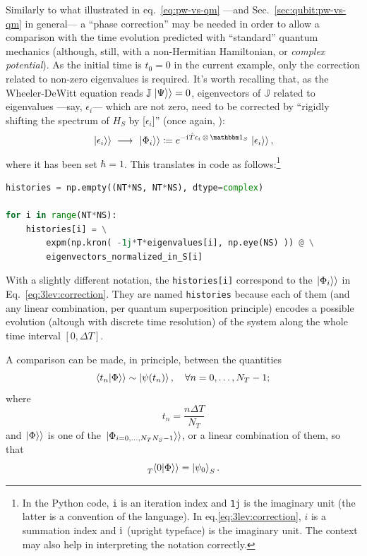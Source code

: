 Similarly to what illustrated in eq.~\eqref{eq:pw-vs-qm} ---and Sec.~\ref{sec:qubit:pw-vs-qm} in general---
a ``phase correction'' may be needed in order to allow a comparison with
the time evolution predicted with ``standard'' quantum mechanics
(although, still, with a non-Hermitian Hamiltonian, or \emph{complex potential}).
As the initial time is $t_0=0$ in the current example, only the
correction related to non-zero eigenvalues is required.
It's worth recalling that,
as the Wheeler-DeWitt equation reads $\mathbb{J} \left.\left| \Psi \right\rangle\right\rangle = 0$,
eigenvectors of $\mathbb{J}$ related to eigenvalues ---say, $\epsilon_{i}$---
which are not zero,
need to be corrected by ``rigidly shifting the spectrum of $H_{S}$
by [$\epsilon_{i}$]'' (once again, \cite[``\textit{The Zero-eigenvalue}'']{Lloyd:Time}):
\begin{equation}
  \dket{\epsilon_i} \;\longrightarrow\; \dket{\Phi_{i}} \eqbydef e^{ -\iu \hat{T} \epsilon_{i} \, \ox \, \idop_{S}} \dket{\epsilon_{i}} \text{,}
  \label{eq:3lev:correction}
\end{equation}
where it has been set $\hbar=1$. This translates in code as follows:\footnote{
  In the Python code, \Verb+i+ is an iteration index and \Verb|1j| is the imaginary unit
  (the latter is a convention of the language).
  In eq.\eqref{eq:3lev:correction},
  $i$ is a summation index and $\mathrm{i}\mkern1mu$ (upright typeface) is the imaginary unit.
  The context may also help in interpreting the notation correctly.
}
\begin{lstlisting}[language=Python]
histories = np.empty((NT*NS, NT*NS), dtype=complex)

for i in range(NT*NS):
    histories[i] = \
        expm(np.kron( -1j*T*eigenvalues[i], np.eye(NS) )) @ \
        eigenvectors_normalized_in_S[i]
\end{lstlisting}
%
With a slightly different notation,
the \Verb|histories[i]|
correspond to the $\left.\left| \Phi_i \right\rangle\right\rangle$ in Eq.~\eqref{eq:3lev:correction}.
They are named \Verb!histories! because each of them
(and any linear combination, per quantum superposition principle)
encodes a possible evolution (altough with discrete time resolution)
of the system along the whole time interval $[0, \Delta T]$.

A comparison can be made, in principle, between the quantities
\begin{equation}\label{eq:3lev:PWComparison}
  \!\left.\left\langle t_n \middle| \Phi \right\rangle\right\rangle \sim \ket{\psi(t_n)}, \quad \forall n = 0, \dots, N_{T}-1 \text{;} 
\end{equation}
where \[ t_{n} = \frac{n\Delta T}{N_T} \]
and
$\left.\left| \Phi \right\rangle\right\rangle$ is one of the ${\left.\left| \Phi_{i=0,\dots,N_T N_S - 1} \right\rangle\right\rangle}$,
or a linear combination of them,
so that
\begin{equation}\label{eq:3lev:PWInitialCond}
  \prescript{}{T}{\!\left.\left\langle 0 \middle| \Phi \right\rangle\right\rangle} = \ket{\psi_0}_S \text{.}
\end{equation}

